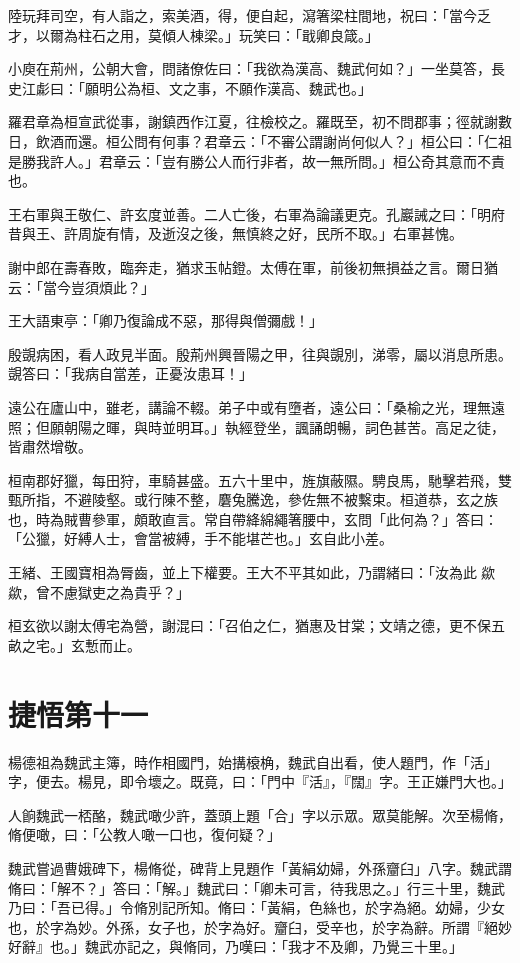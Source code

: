 陸玩拜司空，有人詣之，索美酒，得，便自起，瀉箸梁柱間地，祝曰：「當今乏才，以爾為柱石之用，莫傾人棟梁。」玩笑曰：「戢卿良箴。」

小庾在荊州，公朝大會，問諸僚佐曰：「我欲為漢高、魏武何如？」一坐莫答，長史江虨曰：「願明公為桓、文之事，不願作漢高、魏武也。」

羅君章為桓宣武從事，謝鎮西作江夏，往檢校之。羅既至，初不問郡事；徑就謝數日，飲酒而還。桓公問有何事？君章云：「不審公謂謝尚何似人？」桓公曰：「仁祖是勝我許人。」君章云：「豈有勝公人而行非者，故一無所問。」桓公奇其意而不責也。

王右軍與王敬仁、許玄度並善。二人亡後，右軍為論議更克。孔巖誡之曰：「明府昔與王、許周旋有情，及逝沒之後，無慎終之好，民所不取。」右軍甚愧。

謝中郎在壽春敗，臨奔走，猶求玉帖鐙。太傅在軍，前後初無損益之言。爾日猶云：「當今豈須煩此？」

王大語東亭：「卿乃復論成不惡，那得與僧彌戲！」

殷覬病困，看人政見半面。殷荊州興晉陽之甲，往與覬別，涕零，屬以消息所患。覬答曰：「我病自當差，正憂汝患耳！」

遠公在廬山中，雖老，講論不輟。弟子中或有墮者，遠公曰：「桑榆之光，理無遠照；但願朝陽之暉，與時並明耳。」執經登坐，諷誦朗暢，詞色甚苦。高足之徒，皆肅然增敬。

桓南郡好獵，每田狩，車騎甚盛。五六十里中，旌旗蔽隰。騁良馬，馳擊若飛，雙甄所指，不避陵壑。或行陳不整，麏兔騰逸，參佐無不被繫束。桓道恭，玄之族也，時為賊曹參軍，頗敢直言。常自帶絳綿繩箸腰中，玄問「此何為？」答曰：「公獵，好縛人士，會當被縛，手不能堪芒也。」玄自此小差。

王緒、王國寶相為脣齒，並上下權要。王大不平其如此，乃謂緒曰：「汝為此歘歘，曾不慮獄吏之為貴乎？」

桓玄欲以謝太傅宅為營，謝混曰：「召伯之仁，猶惠及甘棠；文靖之德，更不保五畝之宅。」玄慙而止。



\chapter{捷悟第十一}

楊德祖為魏武主簿，時作相國門，始搆榱桷，魏武自出看，使人題門，作「活」字，便去。楊見，即令壞之。既竟，曰：「門中『活』，『闊』字。王正嫌門大也。」

人餉魏武一桮酪，魏武噉少許，蓋頭上題「合」字以示眾。眾莫能解。次至楊脩，脩便噉，曰：「公教人噉一口也，復何疑？」

魏武嘗過曹娥碑下，楊脩從，碑背上見題作「黃絹幼婦，外孫齏臼」八字。魏武謂脩曰：「解不？」答曰：「解。」魏武曰：「卿未可言，待我思之。」行三十里，魏武乃曰：「吾已得。」令脩別記所知。脩曰：「黃絹，色絲也，於字為絕。幼婦，少女也，於字為妙。外孫，女子也，於字為好。齏臼，受辛也，於字為辭。所謂『絕妙好辭』也。」魏武亦記之，與脩同，乃嘆曰：「我才不及卿，乃覺三十里。」


